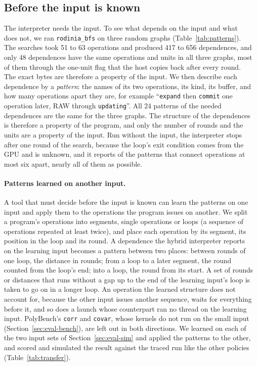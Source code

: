 \documentclass[11pt]{article}
\newcommand{\secref}[1]{Section~\ref{#1}}
\newcommand{\tabref}[1]{Table~\ref{#1}}
\newcommand{\term}[1]{\emph{#1}}
\newcommand{\code}[1]{\texttt{#1}}
\begin{document}
\subsection{Before the input is known}
\label{sec:eval-input}

The interpreter needs the input. To see what depends on the input and what does not, we ran \code{rodinia\_bfs}
on three random graphs (\tabref{tab:patterns}). The searches took 51 to 63 operations and produced 417 to 656
dependences, and only 48 dependences have the same operations and units in all three graphs, most of them
through the one-unit flag that the host copies back after every round. The
exact bytes are therefore a property of the input. We then describe each dependence by a \term{pattern}: the names
of its two operations, its kind, its buffer, and how many operations apart they are, for example ``\code{expand}
then \code{commit} one operation later, RAW through \code{updating}''. All 24 patterns of the needed dependences are
the same for the three graphs. The structure of the dependences is therefore a property of the program, and only
the number of rounds and the units are a property of the input. Run without the input, the interpreter stops
after one round of the search, because the loop's exit condition comes from the GPU and is unknown, and it reports
\numNoInputPatterns{} of the \numNoInputPatternsOf{} patterns that connect operations at most six apart, nearly all
of them as possible.

\paragraph{Patterns learned on another input.} A tool that must decide before the input is known can learn the
patterns on one input and apply them to the operations the program issues on another. We split a program's
operations into segments, single operations or loops (a sequence of operations repeated at least twice), and place
each operation by its segment, its position in the loop and its round. A dependence the hybrid interpreter reports
on the learning input becomes a pattern between two places: between rounds of one loop, the distance in rounds;
from a loop to a later segment, the round counted from the loop's end; into a loop, the round from its start. A
set of rounds or distances that runs without a gap up to the end of the learning input's loop is taken to go on in
a longer loop. An operation the learned structure does not account for, because the other input issues another
sequence, waits for everything before it, and so does a launch whose counterpart ran no thread on the learning
input. PolyBench's \code{corr} and \code{covar}, whose kernels do not run on the small input
(\secref{sec:eval-bench}), are left out in both directions. We learned on each of the two input sets of \secref{sec:eval-sim} and
applied the patterns to the other, and scored and simulated the result against the traced run like the other
policies (\tabref{tab:transfer}).
\end{document}
